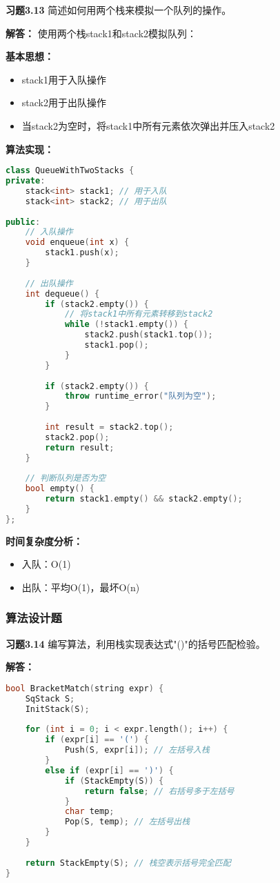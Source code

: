 \documentclass[12pt,a4paper]{amsart}
\begin{document}
\textbf{习题3.13} 简述如何用两个栈来模拟一个队列的操作。

\textbf{解答：}
使用两个栈stack1和stack2模拟队列：

\textbf{基本思想：}
\begin{itemize}
\item stack1用于入队操作
\item stack2用于出队操作
\item 当stack2为空时，将stack1中所有元素依次弹出并压入stack2
\end{itemize}

\textbf{算法实现：}
\begin{lstlisting}[language=C++]
class QueueWithTwoStacks {
private:
    stack<int> stack1; // 用于入队
    stack<int> stack2; // 用于出队
    
public:
    // 入队操作
    void enqueue(int x) {
        stack1.push(x);
    }
    
    // 出队操作
    int dequeue() {
        if (stack2.empty()) {
            // 将stack1中所有元素转移到stack2
            while (!stack1.empty()) {
                stack2.push(stack1.top());
                stack1.pop();
            }
        }
        
        if (stack2.empty()) {
            throw runtime_error("队列为空");
        }
        
        int result = stack2.top();
        stack2.pop();
        return result;
    }
    
    // 判断队列是否为空
    bool empty() {
        return stack1.empty() && stack2.empty();
    }
};
\end{lstlisting}

\textbf{时间复杂度分析：}
\begin{itemize}
\item 入队：O(1)
\item 出队：平均O(1)，最坏O(n)
\end{itemize}

\subsubsection{算法设计题}

\textbf{习题3.14} 编写算法，利用栈实现表达式"()"的括号匹配检验。

\textbf{解答：}
\begin{lstlisting}[language=C++]
bool BracketMatch(string expr) {
    SqStack S;
    InitStack(S);
    
    for (int i = 0; i < expr.length(); i++) {
        if (expr[i] == '(') {
            Push(S, expr[i]); // 左括号入栈
        } 
        else if (expr[i] == ')') {
            if (StackEmpty(S)) {
                return false; // 右括号多于左括号
            }
            char temp;
            Pop(S, temp); // 左括号出栈
        }
    }
    
    return StackEmpty(S); // 栈空表示括号完全匹配
}
\end{lstlisting}
\end{document}
